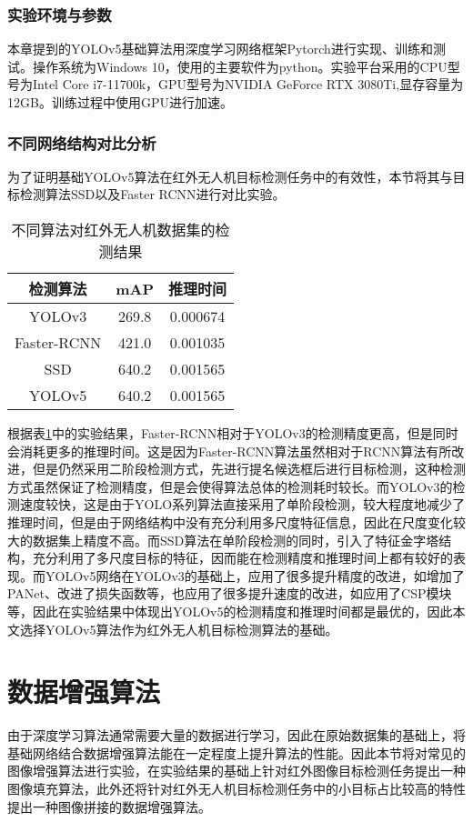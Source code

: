 \subsubsection{实验环境与参数}
本章提到的YOLOv5基础算法用深度学习网络框架Pytorch进行实现、训练和测试。操作系统为Windows 10，使用的主要软件为python。实验平台采用的CPU型号为Intel Core i7-11700k，GPU型号为NVIDIA GeForce RTX 3080Ti,显存容量为12GB。训练过程中使用GPU进行加速。

\subsubsection{不同网络结构对比分析}
为了证明基础YOLOv5算法在红外无人机目标检测任务中的有效性，本节将其与目标检测算法SSD以及Faster RCNN进行对比实验。

\begin{table}[htbp]
  \caption{不同算法对红外无人机数据集的检测结果}
  \vspace{0.5em}\centering\wuhao
  \begin{tabular}{ccc}
  \toprule
  检测算法 & mAP & 推理时间\\
  \midrule
  YOLOv3 & 269.8 & 0.000674\\
  Faster-RCNN & 421.0 & 0.001035\\
  SSD & 640.2 & 0.001565\\
  YOLOv5 & 640.2 & 0.001565\\
  \bottomrule
  \end{tabular}
  \label{t11}
\end{table}

根据表\ref{t11}中的实验结果，Faster-RCNN相对于YOLOv3的检测精度更高，但是同时会消耗更多的推理时间。这是因为Faster-RCNN算法虽然相对于RCNN算法有所改进，但是仍然采用二阶段检测方式，先进行提名候选框后进行目标检测，这种检测方式虽然保证了检测精度，但是会使得算法总体的检测耗时较长。而YOLOv3的检测速度较快，这是由于YOLO系列算法直接采用了单阶段检测，较大程度地减少了推理时间，但是由于网络结构中没有充分利用多尺度特征信息，因此在尺度变化较大的数据集上精度不高。而SSD算法在单阶段检测的同时，引入了特征金字塔结构，充分利用了多尺度目标的特征，因而能在检测精度和推理时间上都有较好的表现。而YOLOv5网络在YOLOv3的基础上，应用了很多提升精度的改进，如增加了PANet、改进了损失函数等，也应用了很多提升速度的改进，如应用了CSP模块等，因此在实验结果中体现出YOLOv5的检测精度和推理时间都是最优的，因此本文选择YOLOv5算法作为红外无人机目标检测算法的基础。

\section{数据增强算法}
由于深度学习算法通常需要大量的数据进行学习，因此在原始数据集的基础上，将基础网络结合数据增强算法能在一定程度上提升算法的性能。因此本节将对常见的图像增强算法进行实验，在实验结果的基础上针对红外图像目标检测任务提出一种图像填充算法，此外还将针对红外无人机目标检测任务中的小目标占比较高的特性提出一种图像拼接的数据增强算法。

